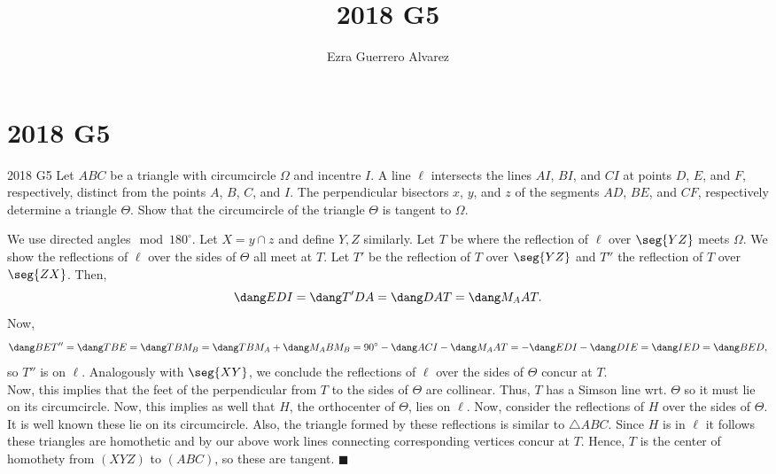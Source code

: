 \documentclass[14pt]{article}
\title{2018 G5}
\author{Ezra Guerrero Alvarez}
\begin{document}
\maketitle
	
\section*{2018 G5}

\begin{statement}{2018 G5}
	Let $ABC$ be a triangle with circumcircle $\Omega$ and incentre $I$. A line $\ell$ intersects the lines $AI$, $BI$, and $CI$ at points $D$, $E$, and $F$, respectively, distinct from the points $A$, $B$, $C$, and $I$. The perpendicular bisectors $x$, $y$, and $z$ of the segments $AD$, $BE$, and $CF$, respectively determine a triangle $\Theta$. Show that the circumcircle of the triangle $\Theta$ is tangent to $\Omega$.
\end{statement}
We use directed angles$\mod180^\circ$. Let $X=y\cap z$ and define $Y,Z$ similarly. Let $T$ be where the reflection of $\ell$ over $\seg{YZ}$ meets $\Omega$. We show the reflections of $\ell$ over the sides of $\Theta$ all meet at $T$. Let $T'$ be the reflection of $T$ over $\seg{YZ}$ and $T''$ the reflection of $T$ over $\seg{ZX}$. Then,
\[ \dang EDI = \dang T'DA = \dang DAT = \dang M_AAT. \]
Now, 
\[ \dang BET''=\dang TBE=\dang TBM_B=\dang TBM_A+\dang M_ABM_B=90^\circ-\dang ACI-\dang M_AAT=-\dang EDI-\dang DIE=\dang IED=\dang BED,  \]
so $T''$ is on $\ell$. Analogously with $\seg{XY}$, we conclude the reflections of $\ell$ over the sides of $\Theta$ concur at $T$.\\
Now, this implies that the feet of the perpendicular from $T$ to the sides of $\Theta$ are collinear. Thus, $T$ has a Simson line wrt. $\Theta$ so it must lie on its circumcircle. Now, this implies as well that $H$, the orthocenter of $\Theta$, lies on $\ell$. Now, consider the reflections of $H$ over the sides of $\Theta$. It is well known these lie on its circumcircle. Also, the triangle formed by these reflections is similar to $\triangle ABC$. Since $H$ is in $\ell$ it follows these triangles are homothetic and by our above work lines connecting corresponding vertices concur at $T$. Hence, $T$ is the center of homothety from $(XYZ)$ to $(ABC)$, so these are tangent. $\blacksquare$

	
\end{document}
